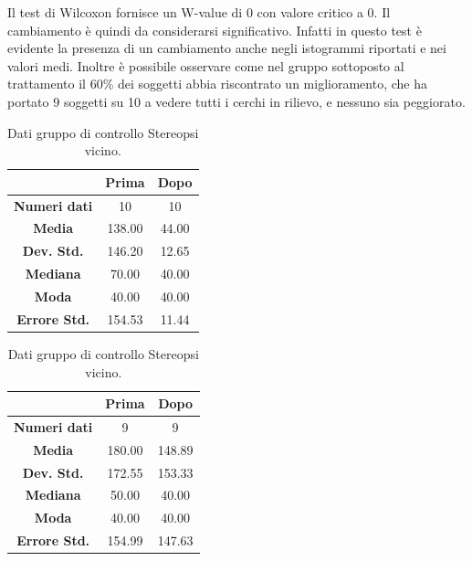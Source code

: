 Il test di Wilcoxon fornisce un W-value di 0 con valore critico a 0. Il cambiamento è quindi da considerarsi significativo. Infatti in questo test è evidente la presenza di un cambiamento anche negli istogrammi riportati e nei valori medi. Inoltre è possibile osservare come nel gruppo sottoposto al trattamento il 60\% dei soggetti abbia riscontrato un miglioramento, che ha portato 9 soggetti su 10 a vedere tutti i cerchi in rilievo, e nessuno sia peggiorato. 
\begin{table}
\centering
\setlength\tabcolsep{4pt}
\begin{minipage}{0.48\textwidth}
\centering

\begin{tabular}{|c|c|c|} \hline
{\textbf{}} & {\textbf{  \hspace{8pt}Prima\hspace{8pt} }} & {\textbf{ \hspace{8pt}Dopo\hspace{8pt}  }}\\ \hline
\textbf{Numeri dati} & 10 & 10 \\ 
\textbf{Media} & 138.00 & 44.00 \\  
\textbf{Dev. Std.} & 146.20 & 12.65 \\  
\textbf{Mediana} & 70.00 & 40.00 \\ 
\textbf{Moda} & 40.00 & 40.00 \\ 
\textbf{Errore Std.} & 154.53 & 11.44 \\ 
\hline
\end{tabular}
\caption{Dati gruppo sperimentale Stereopsi vicino.}

\label{tab:accuracy} 
\end{minipage}%
\hfill
\begin{minipage}{0.48\textwidth}
\centering

\begin{tabular}{|c|c|c|} \hline
{\textbf{}} & {\textbf{  \hspace{8pt}Prima\hspace{8pt} }} & {\textbf{ \hspace{8pt}Dopo\hspace{8pt}  }}\\ \hline
\textbf{Numeri dati} & 9 & 9 \\ 
\textbf{Media} & 180.00 & 148.89 \\  
\textbf{Dev. Std.} & 172.55 & 153.33 \\  
\textbf{Mediana} & 50.00 & 40.00 \\  
\textbf{Moda} & 40.00 & 40.00 \\
\textbf{Errore Std.} & 154.99 & 147.63 \\
\hline
\end{tabular}
\caption{Dati gruppo di controllo Stereopsi vicino.}

 \label{tab:ompdiff} 
\end{minipage}
\end{table}

